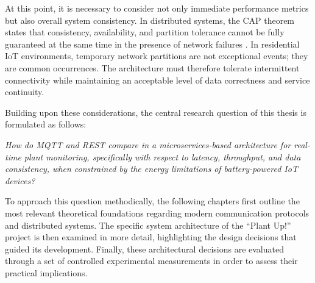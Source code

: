 At this point, it is necessary to consider not only immediate performance metrics but also overall system consistency. In distributed systems, the CAP theorem states that consistency, availability, and partition tolerance cannot be fully guaranteed at the same time in the presence of network failures \cite{gilbertLynchCap2002}. In residential IoT environments, temporary network partitions are not exceptional events; they are common occurrences. The architecture must therefore tolerate intermittent connectivity while maintaining an acceptable level of data correctness and service continuity.

Building upon these considerations, the central research question of this thesis is formulated as follows:

\textit{How do MQTT and REST compare in a microservices-based architecture for real-time plant monitoring, specifically with respect to latency, throughput, and data consistency, when constrained by the energy limitations of battery-powered IoT devices?}

To approach this question methodically, the following chapters first outline the most relevant theoretical foundations regarding modern communication protocols and distributed systems. The specific system architecture of the ``Plant Up!'' project is then examined in more detail, highlighting the design decisions that guided its development. Finally, these architectural decisions are evaluated through a set of controlled experimental measurements in order to assess their practical implications.

\nocite{diplomarbeitSelf}
